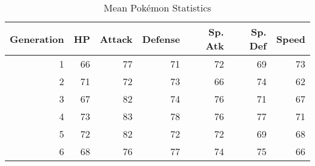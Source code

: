 \begin{table}[ht]
\centering
\begin{tabular}{rrrrrrr}
  \toprule
Generation & HP & Attack & Defense & Sp. Atk & Sp. Def & Speed \\ 
  \midrule
1 & 66 & 77 & 71 & 72 & 69 & 73 \\ 
  2 & 71 & 72 & 73 & 66 & 74 & 62 \\ 
  3 & 67 & 82 & 74 & 76 & 71 & 67 \\ 
  4 & 73 & 83 & 78 & 76 & 77 & 71 \\ 
  5 & 72 & 82 & 72 & 72 & 69 & 68 \\ 
  6 & 68 & 76 & 77 & 74 & 75 & 66 \\ 
   \bottomrule
\end{tabular}
\caption{Mean Pok\'emon Statistics} 
\label{tab:pm}
\end{table}

